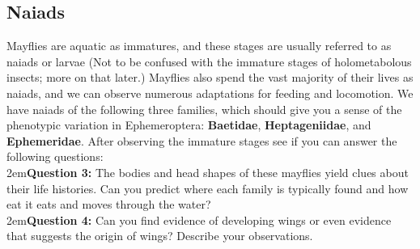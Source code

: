 \documentclass[letterpaper, 11pt]{article}
\begin{document}
\subsection{Naiads}
Mayflies are aquatic as immatures, and these stages are usually referred to as naiads or larvae (Not to be confused with the immature stages of holometabolous insects; more on that later.) Mayflies also spend the vast majority of their lives as naiads, and we can observe numerous adaptations for feeding and locomotion. We have naiads of the following three families, which should give you a sense of the phenotypic variation in Ephemeroptera: \textbf{Baetidae}, \textbf{Heptageniidae}, and \textbf{Ephemeridae}. After observing the immature stages see if you can answer the following questions:\\

\hangindent2em\textbf{Question 3:} The bodies and head shapes of these mayflies yield clues about their life histories. Can you predict where each family is typically found and how eat it eats and moves through the water?\\

\hangindent2em\textbf{Question 4:} Can you find evidence of developing wings or even evidence that suggests the origin of wings? Describe your observations.\\
\end{document}
